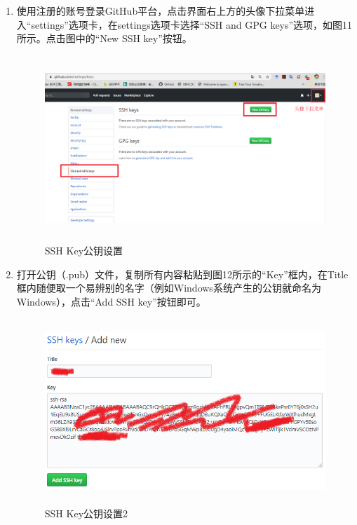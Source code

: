 \documentclass[a4paper,14pt]{article}
\begin{document}
\begin{enumerate}[1. ]
\item 使用注册的账号登录GitHub平台，点击界面右上方的头像下拉菜单进入“settings”选项卡，在settings选项卡选择“SSH and GPG keys”选项，如图11所示。点击图中的“New SSH key”按钮。
\begin{figure}[h]
\centering
\includegraphics[height=7cm]{figure/GitHub_settings}
\caption{SSH Key公钥设置}
\end{figure}
\item 打开公钥（.pub）文件，复制所有内容粘贴到图12所示的“Key”框内，在Title框内随便取一个易辨别的名字（例如Windows系统产生的公钥就命名为Windows），点击“Add SSH key”按钮即可。
\begin{figure}[h]
\centering
\includegraphics[height=7cm]{figure/SSHSet}
\caption{SSH Key公钥设置2}
\end{figure}
\end{enumerate}

\newpage

\quad

\quad

\quad
\end{document}

